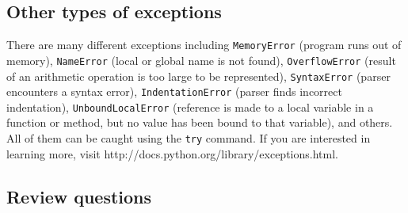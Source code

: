 \subsection{Other types of exceptions}

There are many different exceptions including {\tt MemoryError} (program runs out of memory),
{\tt NameError} (local or global name is not found), {\tt OverflowError} (result of an arithmetic 
operation is too large to be represented), {\tt SyntaxError} (parser encounters a syntax error),
{\tt IndentationError} (parser finds incorrect indentation), {\tt UnboundLocalError} (reference 
is made to a local variable in a function or method, but no value has been bound to that variable),
and others. All of them can be caught using the {\tt try} command. If you are interested in 
learning more, visit http://docs.python.org/library/exceptions.html.

\subsection{Review questions}

